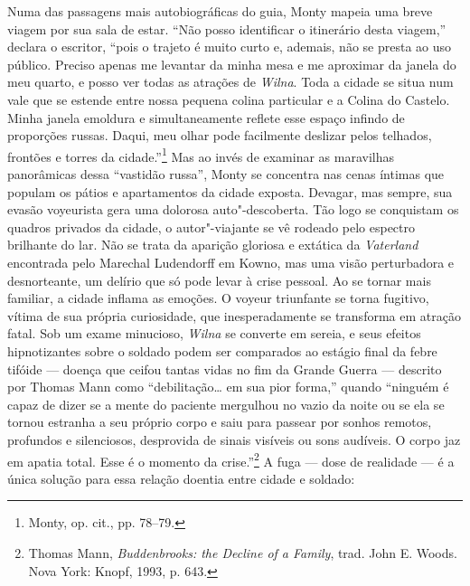 Numa das passagens mais autobiográficas do guia, Monty mapeia uma breve
viagem por sua sala de estar. ``Não posso identificar o itinerário desta
viagem,'' declara o escritor, ``pois o trajeto é muito curto e, ademais,
não se presta ao uso público. Preciso apenas me levantar da minha mesa e
me aproximar da janela do meu quarto, e posso ver todas as atrações de
\textit{Wilna}. Toda a cidade se situa num vale que se estende entre nossa
pequena colina particular e a Colina do Castelo. Minha janela emoldura e
simultaneamente reflete esse espaço infindo de proporções russas. Daqui,
meu olhar pode facilmente deslizar pelos telhados, frontões e torres da
cidade.''\footnote{Monty, op. cit., pp. 78--79.} Mas ao invés de examinar
as maravilhas panorâmicas dessa ``vastidão russa'', Monty se concentra
nas cenas íntimas que populam os pátios e apartamentos da cidade
exposta. Devagar, mas sempre, sua evasão voyeurista gera uma dolorosa
auto"-descoberta. Tão logo se conquistam os quadros privados da cidade, o
autor"-viajante se vê rodeado pelo espectro brilhante do lar. Não se
trata da aparição gloriosa e extática da \textit{Vaterland} encontrada
pelo Marechal Ludendorff em Kowno, mas uma visão perturbadora e
desnorteante, um delírio que só pode levar à crise pessoal. Ao se tornar
mais familiar, a cidade inflama as emoções. O voyeur triunfante se torna
fugitivo, vítima de sua própria curiosidade, que inesperadamente se
transforma em atração fatal. Sob um exame minucioso, \textit{Wilna} se converte
em sereia, e seus efeitos hipnotizantes sobre o soldado podem ser
comparados ao estágio final da febre tifóide --- doença que ceifou tantas
vidas no fim da Grande Guerra --- descrito por Thomas Mann como
``debilitação\ldots{} em sua pior forma,'' quando ``ninguém é capaz de
dizer se a mente do paciente mergulhou no vazio da noite ou se ela se
tornou estranha a seu próprio corpo e saiu para passear por sonhos
remotos, profundos e silenciosos, desprovida de sinais visíveis ou sons
audíveis. O corpo jaz em apatia total. Esse é o momento da
crise.''\footnote{Thomas Mann, \textit{Buddenbrooks: the Decline of a Family}, trad. John E. Woods. Nova York: Knopf, 1993, p. 643.} A fuga --- dose de realidade --- é a única solução para essa relação doentia entre
cidade e soldado:

